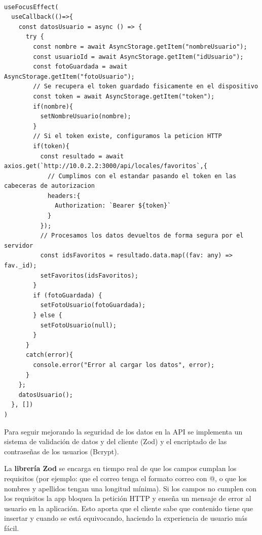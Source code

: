 \documentclass[a4paper,11pt]{article}
\begin{document}
\vspace{0.5cm}

\begin{lstlisting}[style=javascript, caption={Funcionamiento en el Frontend}]

useFocusEffect(
  useCallback(()=>{
    const datosUsuario = async () => {
      try {
        const nombre = await AsyncStorage.getItem("nombreUsuario");
        const usuarioId = await AsyncStorage.getItem("idUsuario");
        const fotoGuardada = await AsyncStorage.getItem("fotoUsuario");
        // Se recupera el token guardado fisicamente en el dispositivo
        const token = await AsyncStorage.getItem("token");
        if(nombre){
          setNombreUsuario(nombre);
        }
        // Si el token existe, configuramos la peticion HTTP
        if(token){
          const resultado = await axios.get(`http://10.0.2.2:3000/api/locales/favoritos`,{
            // Cumplimos con el estandar pasando el token en las cabeceras de autorizacion
            headers:{
              Authorization: `Bearer ${token}`
            }
          });
          // Procesamos los datos devueltos de forma segura por el servidor
          const idsFavoritos = resultado.data.map((fav: any) => fav._id);
          setFavoritos(idsFavoritos);
        }
        if (fotoGuardada) {
          setFotoUsuario(fotoGuardada);
        } else {
          setFotoUsuario(null);
        }
      }
      catch(error){
        console.error("Error al cargar los datos", error);
      }
    };
    datosUsuario();
  }, [])
)

\end{lstlisting}

Para seguir mejorando la seguridad de los datos en la API se implementa un sistema de validación de datos y del cliente (Zod) y el encriptado de las contraseñas de los usuarios (Bcrypt).

La \textbf{librería Zod} se encarga en tiempo real de que los campos cumplan los requisitos (por ejemplo: que el correo tenga el formato correo con @, o que los nombres y apellidos tengan una longitud mínima). Si los campos no cumplen con los requisitos la app bloquea la petición HTTP y enseña un mensaje de error al usuario en la aplicación. Esto aporta que el cliente sabe que contenido tiene que insertar y cuando se está equivocando, haciendo la experiencia de usuario más fácil. \cite{7}

\vspace{0.5cm}
\end{document}
